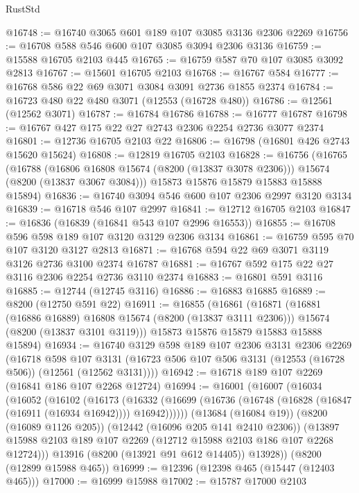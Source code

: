 \begin{lexlean}{RustStd}
\begin{coremodule}
@16748 := @16740 @3065 @601 @189 @107 @3085 @3136 @2306 @2269
@16756 := @16708 @588 @546 @600 @107 @3085 @3094 @2306 @3136
@16759 := @15588 @16705 @2103 @445
@16765 := @16759 @587 @70 @107 @3085 @3092 @2813
@16767 := @15601 @16705 @2103
@16768 := @16767 @584
@16777 := @16768 @586 @22 @69 @3071 @3084 @3091 @2736 @1855 @2374
@16784 := @16723 @480 @22 @480 @3071 (@12553 (@16728 @480))
@16786 := @12561 (@12562 @3071)
@16787 := @16784 @16786
@16788 := @16777 @16787
@16798 := @16767 @427 @175 @22 @27 @2743 @2306 @2254 @2736 @3077 @2374
@16801 := @12736 @16705 @2103 @22
@16806 := @16798 (@16801 @426 @2743 @15620 @15624)
@16808 := @12819 @16705 @2103
@16828 := @16756
    (@16765
      (@16788
        (@16806 @16808 @15674 (@8200 (@13837 @3078 @2306)))
        @15674
        (@8200 (@13837 @3067 @3084)))
      @15873
      @15876
      @15879
      @15883
      @15888
      @15894)
@16836 := @16740 @3094 @546 @600 @107 @2306 @2997 @3120 @3134
@16839 := @16718 @546 @107 @2997
@16841 := @12712 @16705 @2103
@16847 := @16836 (@16839 (@16841 @543 @107 @2996 @16553))
@16855 := @16708 @596 @598 @189 @107 @3120 @3129 @2306 @3134
@16861 := @16759 @595 @70 @107 @3120 @3127 @2813
@16871 := @16768 @594 @22 @69 @3071 @3119 @3126 @2736 @3100 @2374 @16787
@16881 := @16767 @592 @175 @22 @27 @3116 @2306 @2254 @2736 @3110 @2374
@16883 := @16801 @591 @3116
@16885 := @12744 (@12745 @3116)
@16886 := @16883 @16885
@16889 := @8200 (@12750 @591 @22)
@16911 := @16855
    (@16861
      (@16871
        (@16881 (@16886 @16889) @16808 @15674 (@8200 (@13837 @3111 @2306)))
        @15674
        (@8200 (@13837 @3101 @3119)))
      @15873
      @15876
      @15879
      @15883
      @15888
      @15894)
@16934 := @16740
    @3129
    @598
    @189
    @107
    @2306
    @3131
    @2306
    @2269
    (@16718
      @598
      @107
      @3131
      (@16723 @506 @107 @506 @3131 (@12553 (@16728 @506)) (@12561 (@12562 @3131))))
@16942 := @16718 @189 @107 @2269 (@16841 @186 @107 @2268 @12724)
@16994 := @16001
    (@16007
      (@16034
        (@16052
          (@16102
            (@16173
              (@16332
                (@16699 (@16736 (@16748 (@16828 (@16847 (@16911 (@16934 @16942)))) @16942))))))
          (@13684 (@16084 @19))
          (@8200 (@16089 @1126 @205))
          (@12442 (@16096 @205 @141 @2410 @2306))
          (@13897 @15988 @2103 @189 @107 @2269 (@12712 @15988 @2103 @186 @107 @2268 @12724)))
        @13916
        (@8200 (@13921 @91 @612 @14405))
        @13928))
    (@8200 (@12899 @15988 @465))
@16999 := @12396 (@12398 @465 (@15447 (@12403 @465)))
@17000 := @16999 @15988
@17002 := @15787 @17000 @2103

\end{coremodule}
\end{lexlean}
